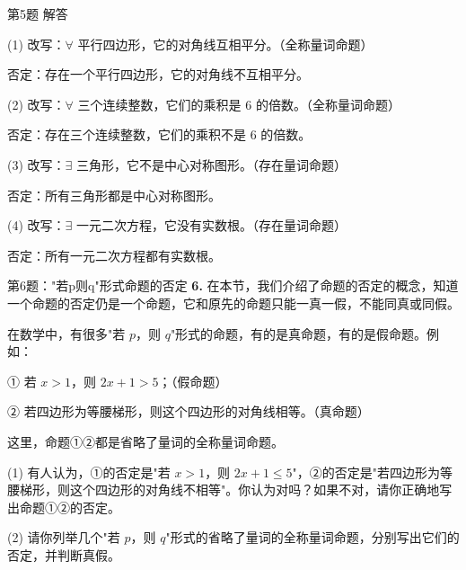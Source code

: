 \documentclass[10pt,aspectratio=169,serif]{beamer}
\begin{document}
\begin{frame}[t]{第5题 解答}
\begin{tcolorbox}[colback=orange!10,colframe=orange,title=\textbf{解}]
(1) 改写：$\forall$ 平行四边形，它的对角线互相平分。（全称量词命题）

\vspace{0.3em}
否定：存在一个平行四边形，它的对角线不互相平分。

\vspace{0.6em}
(2) 改写：$\forall$ 三个连续整数，它们的乘积是 $6$ 的倍数。（全称量词命题）

\vspace{0.3em}
否定：存在三个连续整数，它们的乘积不是 $6$ 的倍数。

\vspace{0.6em}
(3) 改写：$\exists$ 三角形，它不是中心对称图形。（存在量词命题）

\vspace{0.3em}
否定：所有三角形都是中心对称图形。

\vspace{0.6em}
(4) 改写：$\exists$ 一元二次方程，它没有实数根。（存在量词命题）

\vspace{0.3em}
否定：所有一元二次方程都有实数根。
\end{tcolorbox}
\end{frame}

\begin{frame}[t]{第6题："若p则q"形式命题的否定}
\textbf{6.} 在本节，我们介绍了命题的否定的概念，知道一个命题的否定仍是一个命题，它和原先的命题只能一真一假，不能同真或同假。

在数学中，有很多"若 $p$，则 $q$"形式的命题，有的是真命题，有的是假命题。例如：

\vspace{0.3em}
① 若 $x > 1$，则 $2x + 1 > 5$；（假命题）

\vspace{0.3em}
② 若四边形为等腰梯形，则这个四边形的对角线相等。（真命题）

\vspace{0.5em}
这里，命题①②都是省略了量词的全称量词命题。

\vspace{0.5em}
(1) 有人认为，①的否定是"若 $x > 1$，则 $2x + 1 \le 5$"，②的否定是"若四边形为等腰梯形，则这个四边形的对角线不相等"。你认为对吗？如果不对，请你正确地写出命题①②的否定。

\vspace{0.5em}
(2) 请你列举几个"若 $p$，则 $q$"形式的省略了量词的全称量词命题，分别写出它们的否定，并判断真假。
\end{frame}
\end{document}
